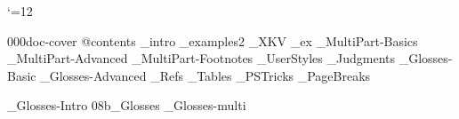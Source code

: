 


 \catcode`\@=12

%






%




\get 000doc-cover
\get @contents
_intro
_examples2
_XKV
_ex
_MultiPart-Basics
_MultiPart-Advanced
_MultiPart-Footnotes
_UserStyles
_Judgments
_Glosses-Basic
_Glosses-Advanced
_Refs
_Tables
_PSTricks
_PageBreaks

%


\bye
{}_Glosses-Intro
\get 08b_Glosses
_Glosses-multi


